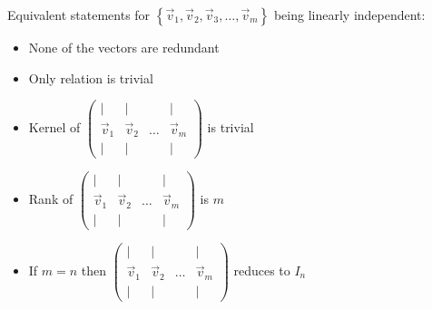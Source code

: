 \noindent
Equivalent statements for $\left\{\vec{v}_{1}, \vec{v}_{2}, \vec{v}_{3}, \ldots, \vec{v}_{m}\right\}$ being linearly independent:
\begin{itemize}
    \item None of the vectors are redundant
    \item Only relation is trivial
    \item Kernel of $\left(\begin{array}{cccc}
        \mid & \mid & & \mid \\
        \vec{v}_{1} & \vec{v}_{2} & \ldots & \vec{v}_{m} \\
        \mid & \mid & & \mid
        \end{array}\right)$ is trivial
    \item Rank of $\left(\begin{array}{cccc}
        \mid & \mid & & \mid \\
        \vec{v}_{1} & \vec{v}_{2} & \ldots & \vec{v}_{m} \\
        \mid & \mid & & \mid
        \end{array}\right)$ is $m$
    \item If $m=n$ then $\left(\begin{array}{cccc}
        \mid & \mid & & \mid \\
        \vec{v}_{1} & \vec{v}_{2} & \ldots & \vec{v}_{m} \\
        \mid & \mid & & \mid
        \end{array}\right)$ reduces to $I_n$
\end{itemize}